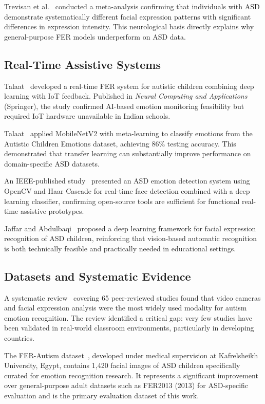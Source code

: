 \documentclass[conference]{IEEEtran}
\begin{document}
Trevisan et al.~\cite{trevisan2018} conducted a meta-analysis
confirming that individuals with ASD demonstrate systematically
different facial expression patterns with significant
differences in expression intensity. This neurological basis
directly explains why general-purpose FER models underperform
on ASD data.

\subsection{Real-Time Assistive Systems}

Talaat~\cite{talaat2023} developed a real-time FER system
for autistic children combining deep learning with IoT
feedback. Published in \textit{Neural Computing and
Applications} (Springer), the study confirmed AI-based
emotion monitoring feasibility but required IoT hardware
unavailable in Indian schools.

Talaat~\cite{talaat2025} applied MobileNetV2 with
meta-learning to classify emotions from the Autistic Children
Emotions dataset, achieving 86\% testing accuracy.
This demonstrated that transfer learning can substantially
improve performance on domain-specific ASD datasets.

An IEEE-published study~\cite{ieee2024} presented an ASD
emotion detection system using OpenCV and Haar Cascade for
real-time face detection combined with a deep learning
classifier, confirming open-source tools are sufficient
for functional real-time assistive prototypes.

Jaffar and Abdulbaqi~\cite{jaffar2023} proposed a deep
learning framework for facial expression recognition of ASD
children, reinforcing that vision-based automatic recognition
is both technically feasible and practically needed in
educational settings.

\subsection{Datasets and Systematic Evidence}

A systematic review~\cite{systematic2024} covering 65
peer-reviewed studies found that video cameras and facial
expression analysis were the most widely used modality for
autism emotion recognition. The review identified a critical
gap: very few studies have been validated in real-world
classroom environments, particularly in developing countries.

The FER-Autism dataset~\cite{ferautism2025}, developed under
medical supervision at Kafrelsheikh University, Egypt,
contains 1,420 facial images of ASD children specifically
curated for emotion recognition research. It represents a
significant improvement over general-purpose adult datasets
such as FER2013 (2013) for ASD-specific evaluation and is
the primary evaluation dataset of this work.
\end{document}

